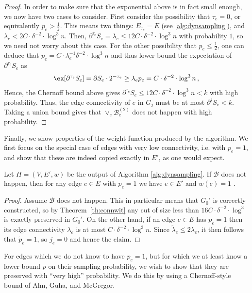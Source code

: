 \begin{proof}
	In order to make sure that the exponential above is in fact small enough, we now have two cases to consider. First consider the possibility that $\tau_e= 0$, or equivalently $p_e > \frac{1}{2}$. This means two things: $E_{\tau_e}=E$ (see \cref{alg:dynsampling}), and $\lambda_e < 2 C \cdot \delta^{-2}\cdot \log^3 n$. Then, $\partial^{\tau_e} S_e=\lambda_e \le 12 C \cdot \delta^{-2}\cdot \log^3 n$ with probability $1$, so we need not worry about this case. For the other possibility that $ p_e \le \frac{1}{2}$, one can deduce that $p_e = C \cdot \lambda_{e}^{-1} \delta^{-2}\cdot \log^3 n$ and thus lower bound the expectation of $\partial^{\tau_e} S_e$ as
	\begin{equation*}
		\ex[\partial^{\tau_e} S_e] = \partial S_e \cdot 2^{-\tau_e} \ge \lambda_e p_e = C \cdot \delta^{-2}\cdot \log^3 n \, ,
	\end{equation*}
	Hence, the Chernoff bound above gives $\partial^{\tau_e} S_e \le 12 C \cdot \delta^{-2}\cdot \log^3 n < k$ with high probability. Thus, the edge connectivity of $e$ in $G_{j}$ must be at most $\partial^{j} S_e < k$. Taking a union bound gives that $\vee_{e} \mathcal{B}^{(2)}_e$ does not happen with high probability.
\end{proof}

\noindent
Finally, we show properties of the weight function produced by the algorithm. We first focus on the special case of edges with very low connectivity, i.e. with $p_e=1$, and show that these are indeed copied exactly in $E'$, as one would expect.

\begin{lemma}
	\label{lem:oneprobsampling}
	Let $H=(V,E',w)$ be the output of Algorithm \ref{alg:dynsampling}. If $\mathcal{B}$ does not happen, then for any edge $e \in E$ with $p_e =1$ we have $e \in E'$ and $w(e)=1$ .
\end{lemma}
\begin{proof}
	Assume $\mathcal{B}$ does not happen. This in particular means that $G_0'$ is correctly constructed, so by Theorem~\ref{th:connwit} any cut of size less than $16C \cdot \delta^{-2}\cdot \log^3$ is exactly preserved in $G_0'$. On the other hand, if an edge $e \in E$ has $p_e = 1$ then its edge connectivity $\lambda_e$ is at most $C \cdot \delta^{-2}\cdot \log^3 n$. Since $\tilde{\lambda}_e \le 2 \lambda_e$, it then follows that $\tilde{p}_e = 1 $, so $j_e=0$ and hence the claim.
\end{proof}

\noindent
For edges which we do not know to have $p_e=1$, but for which we at least know a lower bound $p$ on their sampling probability, we wish to show that they are preserved with ``very high'' probability. We do this by using a Chernoff-style bound of Ahn, Guha, and McGregor.

